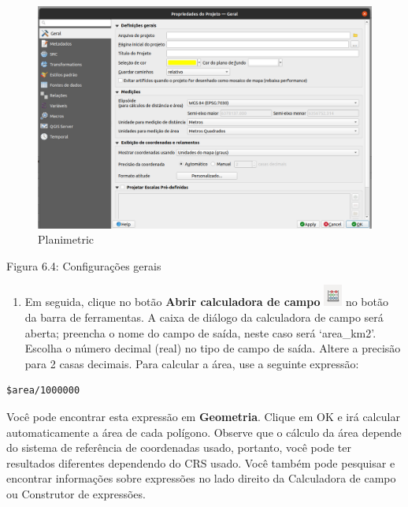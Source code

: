\documentclass[
]{book}
\providecommand{\tightlist}{%
  \setlength{\itemsep}{0pt}\setlength{\parskip}{0pt}}
\begin{document}
\begin{figure}
\centering
\includegraphics{media/modulo6/gen-settings.png}
\caption{Planimetric}
\end{figure}

Figura 6.4: Configurações gerais

\begin{enumerate}
\def\labelenumi{\arabic{enumi}.}
\setcounter{enumi}{4}
\tightlist
\item
  Em seguida, clique no botão \textbf{Abrir calculadora de campo} \includegraphics{media/modulo6/field_calculator.png} no botão da barra de ferramentas. A caixa de diálogo da calculadora de campo será aberta; preencha o nome do campo de saída, neste caso será `area\_km2'. Escolha o número decimal (real) no tipo de campo de saída. Altere a precisão para 2 casas decimais. Para calcular a área, use a seguinte expressão:
\end{enumerate}

\begin{verbatim}
$area/1000000
\end{verbatim}

Você pode encontrar esta expressão em \textbf{Geometria}. Clique em OK e irá calcular automaticamente a área de cada polígono. Observe que o cálculo da área depende do sistema de referência de coordenadas usado, portanto, você pode ter resultados diferentes dependendo do CRS usado. Você também pode pesquisar e encontrar informações sobre expressões no lado direito da Calculadora de campo ou Construtor de expressões.
\end{document}
